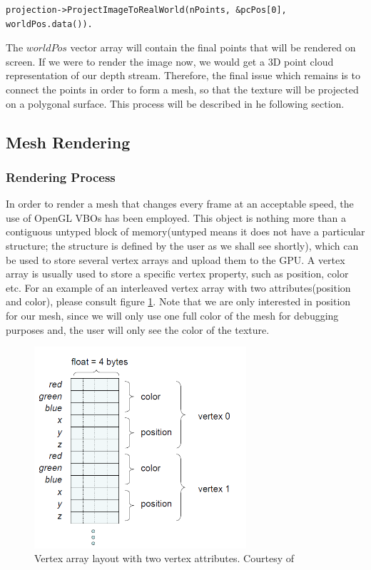 \documentclass[]{article}
\begin{document}
\begin{verbatim}projection->ProjectImageToRealWorld(nPoints, &pcPos[0], worldPos.data()).\end{verbatim}

The $worldPos$ vector array will contain the final points that will be rendered on screen. If we were to render the image now, we would get a 3D point cloud representation of our depth stream. Therefore, the final issue which remains is to connect the points in order to form a mesh, so that the texture will be projected on a polygonal surface. This process will be described in he following section. 

\subsection{Mesh Rendering}

\subsubsection{Rendering Process}

In order to render a mesh that changes every frame at an acceptable speed, the use of OpenGL VBOs has been employed. This object is nothing more than a contiguous untyped block of memory(untyped means it does not have a particular structure; the structure is defined by the user as we shall see shortly), which can be used to store several vertex arrays and upload them to the GPU. A vertex array is usually used to store a specific vertex property, such as position, color etc. For an example of an interleaved vertex array with two attributes(position and color), please consult figure \ref{fig:VertexArrays}. Note that we are only interested in position for our mesh, since we will only use one full color of the mesh for debugging purposes and, the user will only see the color of the texture.

\begin{figure}[hbtp]
    \centering
    \includegraphics[width=0.7\textwidth]{figures/VertexArrays.PNG}
    \caption{Vertex array layout with two vertex attributes. Courtesy of \cite{kilgard2009}}
    \label{fig:VertexArrays}
\end{figure}
\end{document}
